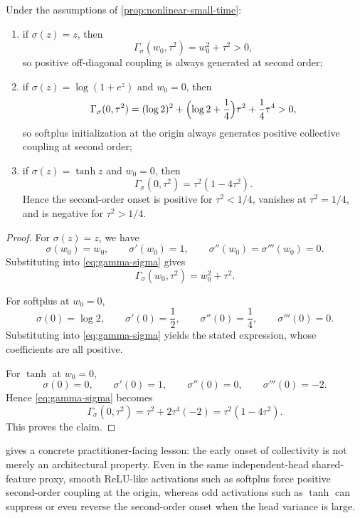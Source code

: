 \begin{corollary}
\label{cor:activation-examples}
Under the assumptions of \cref{prop:nonlinear-small-time}:
\begin{enumerate}[leftmargin=2em]
  \item if $\sigma(z)=z$, then
  \[
    \Gamma_\sigma(w_0,\tau^2)=w_0^2+\tau^2>0,
  \]
  so positive off-diagonal coupling is always generated at second order;
  \item if $\sigma(z)=\log(1+e^z)$ and $w_0=0$, then
  \[
    \Gamma_\sigma(0,\tau^2)
    =
    (\log 2)^2
    +
    \Bigl(
      \log 2+\frac14
    \Bigr)\tau^2
    +
    \frac14 \tau^4
    >0,
  \]
  so softplus initialization at the origin always generates positive collective coupling at second order;
  \item if $\sigma(z)=\tanh z$ and $w_0=0$, then
  \[
    \Gamma_\sigma(0,\tau^2)
    =
    \tau^2(1-4\tau^2).
  \]
  Hence the second-order onset is positive for $\tau^2<1/4$, vanishes at $\tau^2=1/4$, and is negative for $\tau^2>1/4$.
\end{enumerate}
\end{corollary}

\begin{proof}
For $\sigma(z)=z$, we have
\[
  \sigma(w_0)=w_0,
  \qquad
  \sigma'(w_0)=1,
  \qquad
  \sigma''(w_0)=\sigma'''(w_0)=0.
\]
Substituting into \eqref{eq:gamma-sigma} gives
\[
  \Gamma_\sigma(w_0,\tau^2)=w_0^2+\tau^2.
\]

For softplus at $w_0=0$,
\[
  \sigma(0)=\log 2,
  \qquad
  \sigma'(0)=\frac12,
  \qquad
  \sigma''(0)=\frac14,
  \qquad
  \sigma'''(0)=0.
\]
Substituting into \eqref{eq:gamma-sigma} yields the stated expression, whose coefficients are all positive.

For $\tanh$ at $w_0=0$,
\[
  \sigma(0)=0,
  \qquad
  \sigma'(0)=1,
  \qquad
  \sigma''(0)=0,
  \qquad
  \sigma'''(0)=-2.
\]
Hence \eqref{eq:gamma-sigma} becomes
\[
  \Gamma_\sigma(0,\tau^2)
  =
  \tau^2 + 2\tau^4(-2)
  =
  \tau^2(1-4\tau^2).
\]
This proves the claim.
\end{proof}

\begin{remark}
 gives a concrete practitioner-facing lesson:
the early onset of collectivity is not merely an architectural property.
Even in the same independent-head shared-feature proxy, smooth ReLU-like activations such as softplus force positive second-order coupling at the origin,
whereas odd activations such as $\tanh$ can suppress or even reverse the second-order onset when the head variance is large.
\end{remark}

